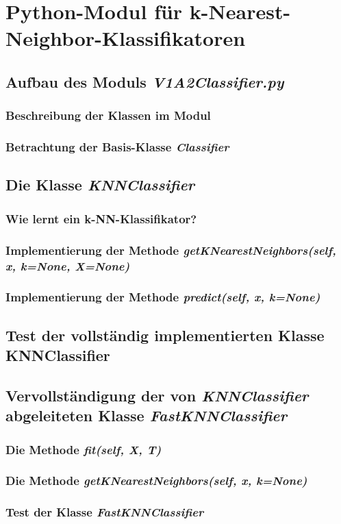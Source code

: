 \section{Python-Modul für k-Nearest-Neighbor-Klassifikatoren}


\subsection{Aufbau des Moduls \textit{V1A2\textunderscore Classifier.py}}


\subsubsection{Beschreibung der Klassen im Modul}


\subsubsection{Betrachtung der Basis-Klasse \textit{Classifier}}


\subsection{Die Klasse \textit{KNNClassifier}}


\subsubsection{Wie lernt ein k-NN-Klassifikator?}


\subsubsection{
    Implementierung der Methode \textit{getKNearestNeighbors(self, x, k=None, X=None)}
    }


\subsubsection{Implementierung der Methode \textit{predict(self, x, k=None)}}


\subsection{Test der vollständig implementierten Klasse KNNClassifier}


\subsection{Vervollständigung der von \textit{KNNClassifier} abgeleiteten Klasse \textit{FastKNNClassifier}}


\subsubsection{Die Methode \textit{fit(self, X, T)}}


\subsubsection{Die Methode \textit{getKNearestNeighbors(self, x, k=None)}}


\subsubsection{Test der Klasse \textit{FastKNNClassifier}}

